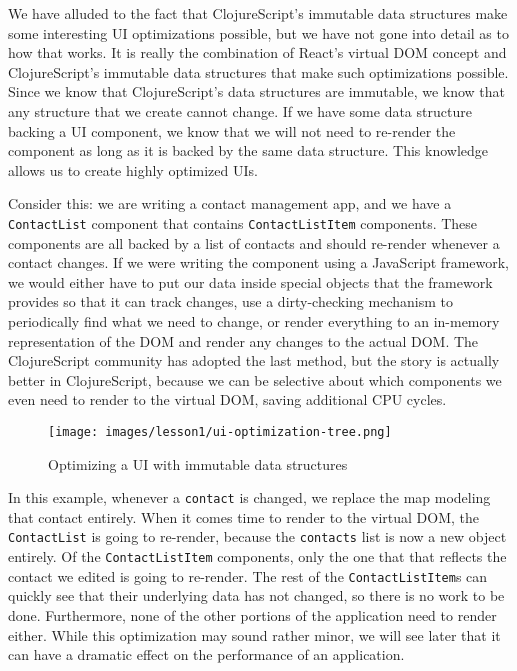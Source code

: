 \documentclass[10pt,twoside,openright]{memoir}
\begin{document}
We have alluded to the fact that ClojureScript's immutable data
structures make some interesting UI optimizations possible, but we have
not gone into detail as to how that works. It is really the combination
of React's virtual DOM concept and ClojureScript's immutable data
structures that make such optimizations possible. Since we know that
ClojureScript's data structures are immutable, we know that any
structure that we create cannot change. If we have some data structure
backing a UI component, we know that we will not need to re-render the
component as long as it is backed by the same data structure. This
knowledge allows us to create highly optimized UIs.

Consider this: we are writing a contact management app, and we have a
\texttt{ContactList} component that contains \texttt{ContactListItem}
components. These components are all backed by a list of contacts and
should re-render whenever a contact changes. If we were writing the
component using a JavaScript framework, we would either have to put our
data inside special objects that the framework provides so that it can
track changes, use a dirty-checking mechanism to periodically find what
we need to change, or render everything to an in-memory representation
of the DOM and render any changes to the actual DOM. The ClojureScript
community has adopted the last method, but the story is actually better
in ClojureScript, because we can be selective about which components we
even need to render to the virtual DOM, saving additional CPU cycles.

\begin{figure}[H]
\caption{Optimizing a UI with immutable data structures}
\centering
\texttt{[image: images/lesson1/ui-optimization-tree.png]}
\end{figure}

In this example, whenever a \texttt{contact} is changed, we replace the
map modeling that contact entirely. When it comes time to render to the
virtual DOM, the \texttt{ContactList} is going to re-render, because the
\texttt{contacts} list is now a new object entirely. Of the
\texttt{ContactListItem} components, only the one that that reflects the
contact we edited is going to re-render. The rest of the
\texttt{ContactListItem}s can quickly see that their underlying data has
not changed, so there is no work to be done. Furthermore, none of the
other portions of the application need to render either. While this
optimization may sound rather minor, we will see later that it can have
a dramatic effect on the performance of an application.
\end{document}
